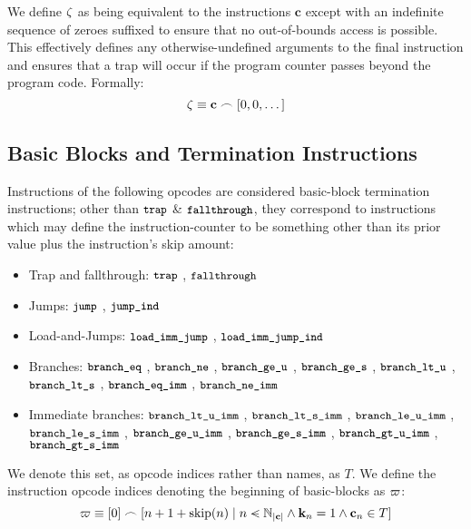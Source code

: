 We define $\zeta$ as being equivalent to the instructions $\mathbf{c}$ except with an indefinite sequence of zeroes suffixed to ensure that no out-of-bounds access is possible. This effectively defines any otherwise-undefined arguments to the final instruction and ensures that a trap will occur if the program counter passes beyond the program code. Formally:
\begin{equation}\label{eq:instructions}
  \instructions \equiv \mathbf{c} \concat \sq{0, 0, \dots}
\end{equation}

\subsection{Basic Blocks and Termination Instructions}

Instructions of the following opcodes are considered basic-block termination instructions; other than $\text{{\small \texttt{trap}}}$ \& $\text{{\small \texttt{fallthrough}}}$, they correspond to instructions which may define the instruction-counter to be something other than its prior value plus the instruction's skip amount:
\begin{itemize}
  \item Trap and fallthrough: $\text{{\small \texttt{trap}}}$
  , $\text{{\small \texttt{fallthrough}}}$
  \item Jumps: $\text{{\small \texttt{jump}}}$
  , $\text{{\small \texttt{jump\_ind}}}$
  \item Load-and-Jumps: $\text{{\small \texttt{load\_imm\_jump}}}$
  , $\text{{\small \texttt{load\_imm\_jump\_ind}}}$
  \item Branches: $\text{{\small \texttt{branch\_eq}}}$
  , $\text{{\small \texttt{branch\_ne}}}$
  , $\text{{\small \texttt{branch\_ge\_u}}}$
  , $\text{{\small \texttt{branch\_ge\_s}}}$
  , $\text{{\small \texttt{branch\_lt\_u}}}$
  , $\text{{\small \texttt{branch\_lt\_s}}}$
  , $\text{{\small \texttt{branch\_eq\_imm}}}$
  , $\text{{\small \texttt{branch\_ne\_imm}}}$
  \item Immediate branches: $\text{{\small \texttt{branch\_lt\_u\_imm}}}$
  , $\text{{\small \texttt{branch\_lt\_s\_imm}}}$
  , $\text{{\small \texttt{branch\_le\_u\_imm}}}$
  , $\text{{\small \texttt{branch\_le\_s\_imm}}}$
  , $\text{{\small \texttt{branch\_ge\_u\_imm}}}$
  , $\text{{\small \texttt{branch\_ge\_s\_imm}}}$
  , $\text{{\small \texttt{branch\_gt\_u\_imm}}}$
  , $\text{{\small \texttt{branch\_gt\_s\_imm}}}$
\end{itemize}

We denote this set, as opcode indices rather than names, as $T$. We define the instruction opcode indices denoting the beginning of basic-blocks as $\varpi$:
\begin{equation}
  \basicblocks \equiv [0] \concat [n + 1 + \Fskip(n) \mid n \orderedin \N_{|\mathbf{c}|} \wedge \mathbf{k}_n = 1 \wedge \mathbf{c}_n \in T]
\end{equation}


